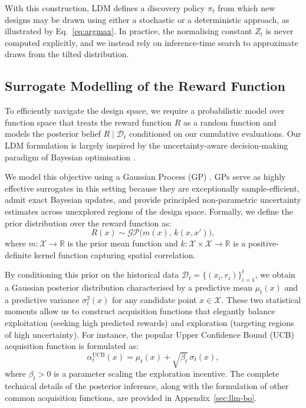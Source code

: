 With this construction, LDM defines a discovery policy $\pi_t$ from which new designs may be drawn using either a stochastic or a deterministic approach, as illustrated by Eq.~\eqref{eq:argmax}. In practice, the normalising constant $Z_t$ is never computed explicitly, and we instead rely on inference-time search to approximate draws from the tilted distribution.

\subsection{Surrogate Modelling of the Reward Function}
\label{sec:surrogate}

To efficiently navigate the design space, we require a probabilistic model over function space that treats the reward function $R$ as a random function and models the posterior belief $R \mid \mathcal{D}_t$ conditioned on our cumulative evaluations. Our LDM formulation is largely inspired by the uncertainty-aware decision-making paradigm of Bayesian optimisation \citep{garnettBayesianOptimization2023}.

We model this objective using a Gaussian Process (GP) \citep{rasmussen2006gaussian}. GPs serve as highly effective surrogates in this setting because they are exceptionally sample-efficient, admit exact Bayesian updates, and provide principled non-parametric uncertainty estimates across unexplored regions of the design space. Formally, we define the prior distribution over the reward function as:
\begin{equation}
\label{eq:gp_prior_main}
R(x) \sim \mathcal{GP}\bigl(m(x),\, k(x, x')\bigr),
\end{equation}
where $m: \mathcal{X} \to \mathbb{R}$ is the prior mean function and $k: \mathcal{X} \times \mathcal{X} \to \mathbb{R}$ is a positive-definite kernel function capturing spatial correlation. 

By conditioning this prior on the historical data $\mathcal{D}_t = \{(x_i, r_i)\}_{i=1}^{t}$, we obtain a Gaussian posterior distribution characterised by a predictive mean $\mu_t(x)$ and a predictive variance $\sigma_t^2(x)$ for any candidate point $x \in \mathcal{X}$. These two statistical moments allow us to construct acquisition functions that elegantly balance exploitation (seeking high predicted rewards) and exploration (targeting regions of high uncertainty). For instance, the popular Upper Confidence Bound (UCB) acquisition function is formulated as:
\begin{equation}
\label{eq:ucb_main}
\alpha^{\mathrm{UCB}}_t(x) = \mu_t(x) + \sqrt{\beta_t}\,\sigma_t(x),
\end{equation}
where $\beta_t > 0$ is a parameter scaling the exploration incentive. The complete technical details of the posterior inference, along with the formulation of other common acquisition functions, are provided in Appendix~\ref{sec:llm-bo}.

